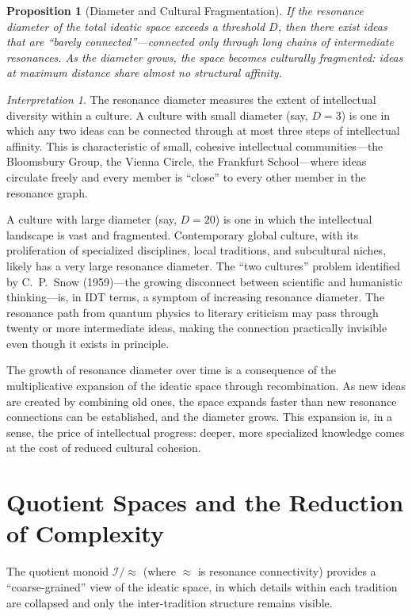 \documentclass[11pt,openany]{book}
\theoremstyle{definition}
\theoremstyle{plain}
\newtheorem{proposition}[axiom]{Proposition}
\theoremstyle{remark}
\newtheorem{interpretation}[axiom]{Interpretation}
\newcommand{\IS}{\mathcal{I}}               %
\begin{document}
\begin{proposition}[Diameter and Cultural Fragmentation]
If the resonance diameter of the total ideatic space exceeds a threshold $D$, then there exist ideas that are ``barely connected''---connected only through long chains of intermediate resonances. As the diameter grows, the space becomes culturally fragmented: ideas at maximum distance share almost no structural affinity.
\end{proposition}

\begin{interpretation}
The resonance diameter measures the extent of intellectual diversity within a culture. A culture with small diameter (say, $D = 3$) is one in which any two ideas can be connected through at most three steps of intellectual affinity. This is characteristic of small, cohesive intellectual communities---the Bloomsbury Group, the Vienna Circle, the Frankfurt School---where ideas circulate freely and every member is ``close'' to every other member in the resonance graph.

A culture with large diameter (say, $D = 20$) is one in which the intellectual landscape is vast and fragmented. Contemporary global culture, with its proliferation of specialized disciplines, local traditions, and subcultural niches, likely has a very large resonance diameter. The ``two cultures'' problem identified by C.~P.~Snow (1959)---the growing disconnect between scientific and humanistic thinking---is, in IDT terms, a symptom of increasing resonance diameter. The resonance path from quantum physics to literary criticism may pass through twenty or more intermediate ideas, making the connection practically invisible even though it exists in principle.

The growth of resonance diameter over time is a consequence of the multiplicative expansion of the ideatic space through recombination. As new ideas are created by combining old ones, the space expands faster than new resonance connections can be established, and the diameter grows. This expansion is, in a sense, the price of intellectual progress: deeper, more specialized knowledge comes at the cost of reduced cultural cohesion.
\end{interpretation}

\section{Quotient Spaces and the Reduction of Complexity}

The quotient monoid $\IS/{\approx}$ (where $\approx$ is resonance connectivity) provides a ``coarse-grained'' view of the ideatic space, in which details within each tradition are collapsed and only the inter-tradition structure remains visible.
\end{document}
